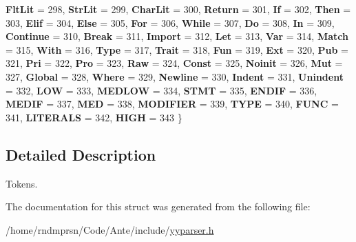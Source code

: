 \begin{DoxyCompactItemize}
{\bfseries Flt\+Lit} = 298, 
{\bfseries Str\+Lit} = 299, 
{\bfseries Char\+Lit} = 300, 
{\bfseries Return} = 301, 
\newline
{\bfseries If} = 302, 
{\bfseries Then} = 303, 
{\bfseries Elif} = 304, 
{\bfseries Else} = 305, 
\newline
{\bfseries For} = 306, 
{\bfseries While} = 307, 
{\bfseries Do} = 308, 
{\bfseries In} = 309, 
\newline
{\bfseries Continue} = 310, 
{\bfseries Break} = 311, 
{\bfseries Import} = 312, 
{\bfseries Let} = 313, 
\newline
{\bfseries Var} = 314, 
{\bfseries Match} = 315, 
{\bfseries With} = 316, 
{\bfseries Type} = 317, 
\newline
{\bfseries Trait} = 318, 
{\bfseries Fun} = 319, 
{\bfseries Ext} = 320, 
{\bfseries Pub} = 321, 
\newline
{\bfseries Pri} = 322, 
{\bfseries Pro} = 323, 
{\bfseries Raw} = 324, 
{\bfseries Const} = 325, 
\newline
{\bfseries Noinit} = 326, 
{\bfseries Mut} = 327, 
{\bfseries Global} = 328, 
{\bfseries Where} = 329, 
\newline
{\bfseries Newline} = 330, 
{\bfseries Indent} = 331, 
{\bfseries Unindent} = 332, 
{\bfseries L\+OW} = 333, 
\newline
{\bfseries M\+E\+D\+L\+OW} = 334, 
{\bfseries S\+T\+MT} = 335, 
{\bfseries E\+N\+D\+IF} = 336, 
{\bfseries M\+E\+D\+IF} = 337, 
\newline
{\bfseries M\+ED} = 338, 
{\bfseries M\+O\+D\+I\+F\+I\+ER} = 339, 
{\bfseries T\+Y\+PE} = 340, 
{\bfseries F\+U\+NC} = 341, 
\newline
{\bfseries L\+I\+T\+E\+R\+A\+LS} = 342, 
{\bfseries H\+I\+GH} = 343
 \}
\end{DoxyCompactItemize}


\subsection{Detailed Description}
Tokens. 

The documentation for this struct was generated from the following file\+:\begin{DoxyCompactItemize}
\item 
/home/rndmprsn/\+Code/\+Ante/include/\hyperlink{yyparser_8h}{yyparser.\+h}\end{DoxyCompactItemize}
